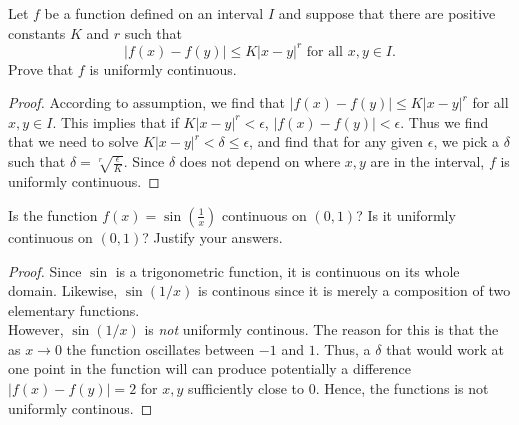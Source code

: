 \documentclass[12pt]{book}
\newenvironment{exercise}[2][Exercise]{\begin{trivlist}
\item[\hskip \labelsep {\bfseries #1}\hskip \labelsep {\bfseries #2.}]}{\end{trivlist}}
\begin{document}
\begin{exercise}{3.3.8}
Let $f$ be a function defined on an interval $I$ and suppose that there are positive constants $K$ and $r$ such that 
	\[ |f(x)-f(y)| \leq K |x-y|^r \text{ for all } x,y \in I. \]
Prove that $f$ is uniformly continuous.

	\begin{proof}
	According to assumption, we find that $|f(x)-f(y)| \leq K |x-y|^r$ for all $x,y \in I$. This implies that if $K | x-y|^r < \epsilon$, $|f(x)-f(y)|<\epsilon$. Thus we find that we need to solve $K |x-y|^r < \delta \leq \epsilon$, and find that for any given $\epsilon$, we pick a $\delta$ such that $\delta = \sqrt[r]{\frac{\epsilon}{K}}$. Since $\delta$ does not depend on where $x,y$ are in the interval, $f$ is uniformly continuous.
	\end{proof}
\end{exercise}



\begin{exercise}{3.3.9}
Is the function $f(x)=\sin(\frac{1}{x})$ continuous on $(0,1)$? Is it uniformly continuous on $(0,1)$? Justify your answers. 
	
	\begin{proof}
	Since $\sin$ is a trigonometric function, it is continuous on its whole domain. Likewise, $\sin(1/x)$ is continous since it is merely a composition of two elementary functions. \\
	However, $\sin(1/x)$ is \emph{not} uniformly continous. The reason for this is that the as $x \to 0$ the function oscillates between $-1$ and $1$. Thus, a $\delta$ that would work at one point in the function will can produce potentially a difference $|f(x)-f(y)|=2$ for $x,y$ sufficiently close to 0. Hence, the functions is not uniformly continous.
	\end{proof}
\end{exercise}
\end{document}
